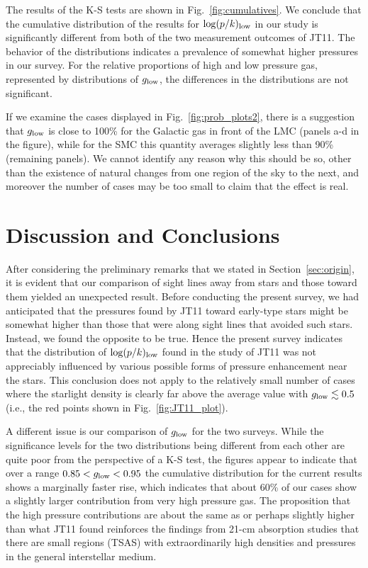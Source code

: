 \documentclass[modern]{aastex63}
\begin{document}
The results of the K-S tests are shown in Fig.~\ref{fig:cumulatives}.  We conclude that the 
cumulative distribution of the results for $\log (p/k)_{\rm low}$ in our study is significantly 
different from both of the two measurement outcomes of JT11.  The behavior of the 
distributions indicates a prevalence of somewhat higher pressures in our survey.  For the 
relative proportions of high and low pressure gas, represented by distributions of $g_{\rm 
low}$, the differences in the distributions are not significant.

If we examine the cases displayed in Fig.~\ref{fig:prob_plots2}, there is a suggestion that 
$g_{\rm low}$ is close to 100\% for the Galactic gas in front of the LMC (panels a-d in the 
figure), while for the SMC this quantity averages slightly less than 90\% (remaining panels).  We 
cannot identify any reason why this should be so, other than the existence of natural changes 
from one region of the sky to the next, and moreover the number of cases may be too small to 
claim that the effect is real.

\section{Discussion and Conclusions}\label{sec:discussion}

After considering the preliminary remarks that we stated in Section~\ref{sec:origin}, it is 
evident that our comparison of sight lines away from stars and those toward them yielded an 
unexpected result.  Before conducting the present survey, we had anticipated that the 
pressures found by JT11 toward early-type stars might be somewhat higher than those that 
were along sight lines that avoided such stars.  Instead, we found the opposite to be true.  
Hence the present survey indicates that the distribution of $\log (p/k)_{\rm low}$ found in the 
study of JT11 was not appreciably influenced by various possible forms of pressure 
enhancement near the stars.  This conclusion does not apply to the relatively small number of 
cases where the starlight density is clearly far above the average value with $g_{\rm 
low}\lesssim 0.5$ (i.e., the red points shown in Fig.~\ref{fig:JT11_plot}).

A different issue is our comparison of $g_{\rm low}$ for the two surveys.  While the significance 
levels for the two distributions being different from each other are quite poor from the 
perspective of a K-S test, the figures appear to indicate that over a range $0.85< g_{\rm low}< 
0.95$ the cumulative distribution for the current results shows a marginally faster rise, which 
indicates that about 60\% of our cases show a slightly larger contribution from very high 
pressure gas.  The proposition that the high pressure contributions are about the same as or 
perhaps slightly higher than what JT11 found reinforces the findings from 21-cm absorption 
studies that there are small regions (TSAS) with extraordinarily high densities and pressures in 
the general interstellar medium.
\end{document}

